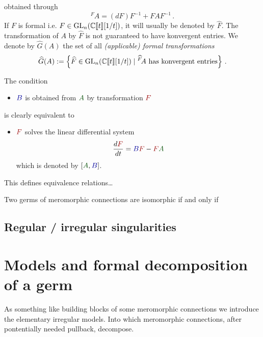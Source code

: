 obtained through
\[
  {}^F\!A=(dF)F^{-1} + FAF^{-1} \,.
\]
If $F$ is formal i.e. $F\in\operatorname{GL}_n(\mathbb{C}\llbracket t\rrbracket[1/t])$, it will
usually be denoted by $\hat F$. The transformation of $A$ by $\hat F$ is not
guaranteed to have konvergent entries.
We denote by $\hat G(A)$ the set of all \emph{(applicable) formal
transformations}
\[
  \widehat G(A):=\left\{\widehat F\in\operatorname{GL}_n(\mathbb{C}\llbracket t\rrbracket[1/t])
    \mid {}^{\widehat F}\!A \text{ has konvergent entries}
  \right\}\,.
\]
\begin{rem}
  \def\myB{\textcolor{blue!60!black}{B}}
  \def\myA{\textcolor{green!30!black}{A}}
  \def\myF{\textcolor{red!60!black}{F}}
  The condition
  \begin{itemize}
    \item[] $\myB$ is obtained from $\myA$ by transformation $\myF$
  \end{itemize}
  is clearly equivalent to
  \begin{itemize}
    \item[]  $\myF$ solves the linear differential system
      \[
        \frac{d\myF}{dt}=\myB\myF-\myF\myA
      \]
      which is denoted by $[\myA,\myB]$.
  \end{itemize}
\end{rem}

This defines equivalence relations\dots \TODO

\begin{defn}
  Two germs of meromorphic connections are isomorphic if and only if \TODO
\end{defn}

\subsection{Regular / irregular singularities}

\section{Models and formal decomposition of a germ}
As something like building blocks of some meromorphic connections we introduce
the elementary irregular models. Into which meromorphic connections, after
pontentially needed pullback, decompose.

